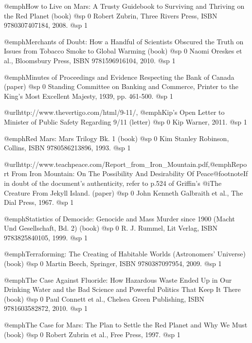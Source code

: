 \item
@emph{How to Live on Mars: A Trusty Guidebook to Surviving and Thriving on the Red Planet} (book)
@sp 0
Robert Zubrin, Three Rivers Press, ISBN 9780307407184, 2008.
@sp 1

\item
@emph{Merchants of Doubt: How a Handful of Scientists Obscured the Truth on Issues from Tobacco Smoke to Global Warming} (book)
@sp 0
Naomi Oreskes et al., Bloomsbury Press, ISBN 9781596916104, 2010.
@sp 1

\item
@emph{Minutes of Proceedings and Evidence Respecting the Bank of Canada} (paper)
@sp 0
Standing Committee on Banking and Commerce, Printer to the King's Most Excellent Majesty, 1939, pp. 461-500.
@sp 1

\item
@url{http://www.thevertigo.com/html/9-11/, @emph{Kip's Open Letter to Minister of Public Safety Regarding 9/11}} (letter)
@sp 0
Kip Warner, 2011.
@sp 1

\item
@emph{Red Mars: Mars Trilogy Bk. 1} (book)
@sp 0
Kim Stanley Robinson, Collins, ISBN 9780586213896, 1993.
@sp 1

\item
@url{http://www.teachpeace.com/Report_from_Iron_Mountain.pdf,@emph{Report From Iron Mountain: On The Possibility And Desirability Of Peace}}@footnote{If in doubt of the document's authenticity, refer to p.524 of Griffin's @i{The Creature From Jekyll Island}.} (paper)
@sp 0
John Kenneth Galbraith et al., The Dial Press, 1967.
@sp 1

\item
@emph{Statistics of Democide: Genocide and Mass Murder since 1900 (Macht Und Gesellschaft, Bd. 2)} (book)
@sp 0
R. J. Rummel, Lit Verlag, ISBN 9783825840105, 1999.
@sp 1

\item
@emph{Terraforming: The Creating of Habitable Worlds (Astronomers' Universe)} (book)
@sp 0
Martin Beech, Springer, ISBN 9780387097954, 2009.
@sp 1

\item
@emph{The Case Against Fluoride: How Hazardous Waste Ended Up in Our Drinking Water and the Bad Science and Powerful Politics That Keep It There} (book)
@sp 0
Paul Connett et al., Chelsea Green Publishing, ISBN 9781603582872, 2010.
@sp 1

\item
@emph{The Case for Mars: The Plan to Settle the Red Planet and Why We Must} (book)
@sp 0
Robert Zubrin et al., Free Press, 1997.
@sp 1

